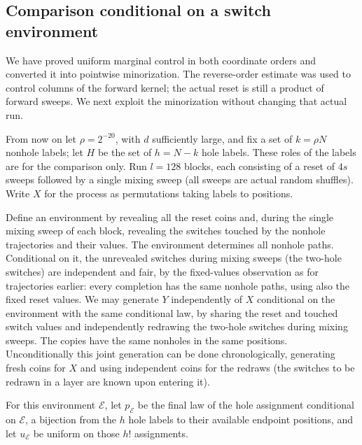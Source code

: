 \subsection{Comparison conditional on a switch environment}

We have proved uniform marginal control in both coordinate orders and converted it into pointwise minorization. The reverse-order estimate was used to control columns of the forward kernel; the actual reset is still a product of forward sweeps. We next exploit the minorization without changing that actual run.

 From now on let \(\rho=2^{-20}\), with \(d\) sufficiently large, and fix a set of \(k=\rho N\) nonhole labels; let \(H\) be the set of \(h=N-k\) hole labels. These roles of the labels are for the comparison only. Run \(l=128\) blocks, each consisting of a reset of \(4s\) sweeps followed by a single mixing sweep (all sweeps are actual random shuffles). Write \(X\) for the process as permutations taking labels to positions.

Define an environment by revealing all the reset coins and, during the single mixing sweep of each block, revealing the switches touched by the nonhole trajectories and their values. The environment determines all nonhole paths. Conditional on it, the unrevealed switches during mixing sweeps (the two-hole switches) are independent and fair, by the fixed-values observation as for trajectories earlier: every completion has the same nonhole paths, using also the fixed reset values. We may generate \(Y\) independently of \(X\) conditional on the environment with the same conditional law, by sharing the reset and touched switch values and independently redrawing the two-hole switches during mixing sweeps. The copies have the same nonholes in the same positions. Unconditionally this joint generation can be done chronologically, generating fresh coins for \(X\) and using independent coins for the redraws (the switches to be redrawn in a layer are known upon entering it).

For this environment $\mathcal E$, let $p_{\mathcal E}$ be the final law of the hole assignment conditional on $\mathcal E$, a bijection from the $h$ hole labels to their available endpoint positions, and let $u_{\mathcal E}$ be uniform on those $h!$ assignments.

